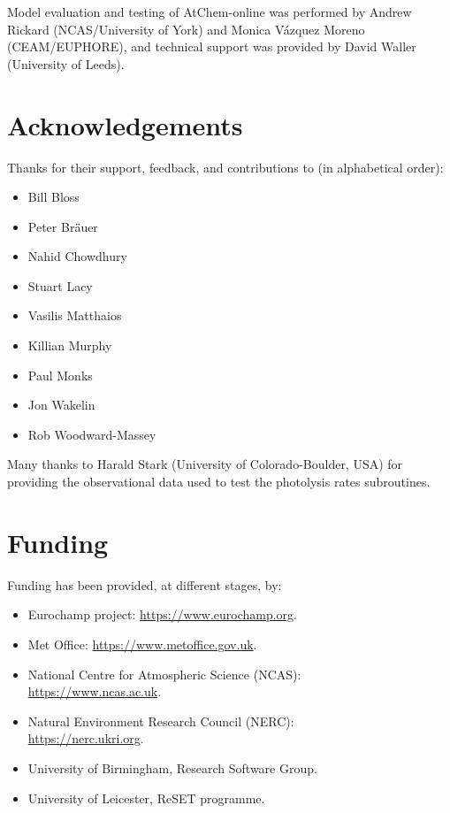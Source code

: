 Model evaluation and testing of AtChem-online was performed by Andrew
Rickard (NCAS/University of York) and Monica V{\'a}zquez Moreno
(CEAM/EUPHORE), and technical support was provided by David Waller
(University of Leeds).

\section{Acknowledgements} \label{sec:acknowledgements}

Thanks for their support, feedback, and contributions to (in
alphabetical order):

\begin{itemize}
\item Bill Bloss
\item Peter Br{\"a}uer
\item Nahid Chowdhury
\item Stuart Lacy
\item Vasilis Matthaios
\item Killian Murphy
\item Paul Monks
\item Jon Wakelin
\item Rob Woodward-Massey
\end{itemize}

Many thanks to Harald Stark (University of Colorado-Boulder, USA) for
providing the observational data used to test the photolysis rates
subroutines.

\section{Funding} \label{sec:funding}

Funding has been provided, at different stages, by:

\begin{itemize}
\item Eurochamp project: \url{https://www.eurochamp.org}.
\item Met Office: \url{https://www.metoffice.gov.uk}.
\item National Centre for Atmospheric Science (NCAS):\\ \url{https://www.ncas.ac.uk}.
\item Natural Environment Research Council (NERC):\\ \url{https://nerc.ukri.org}.
\item University of Birmingham, Research Software Group.
\item University of Leicester, ReSET programme.
\end{itemize}
